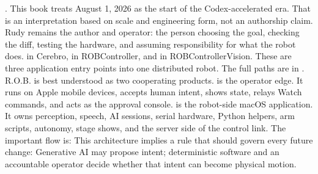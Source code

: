 {}.\markdownRendererParagraphSeparator
{}This book treats August 1, 2026 as the start of the Codex-accelerated era. That\markdownRendererSoftLineBreak
{}is an interpretation based on scale and engineering form, not an authorship\markdownRendererSoftLineBreak
{}claim. Rudy remains the author and operator: the person choosing the goal,\markdownRendererSoftLineBreak
{}checking the diff, testing the hardware, and assuming responsibility for what\markdownRendererSoftLineBreak
{}the robot does.\markdownRendererInterblockSeparator
{}\markdownRendererThematicBreak{}\markdownRendererInterblockSeparator
{}
\markdownRendererSectionEnd \markdownRendererSectionBegin
{}\markdownRendererInterblockSeparator
{}\markdownRendererBlockQuoteBegin
{}  in Cerebro,  in ROBController, and  in ROBControllerVision. These are three application entry points into one distributed robot. The full paths are in .\markdownRendererBlockQuoteEnd \markdownRendererInterblockSeparator
{}R.O.B. is best understood as two cooperating products.\markdownRendererParagraphSeparator
{} is the operator edge. It runs on Apple mobile devices, accepts\markdownRendererSoftLineBreak
{}human intent, shows state, relays Watch commands, and acts as the approval\markdownRendererSoftLineBreak
{}console.  is the robot-side macOS application. It owns perception,\markdownRendererSoftLineBreak
{}speech, AI sessions, serial hardware, Python helpers, arm scripts, autonomy,\markdownRendererSoftLineBreak
{}stage shows, and the server side of the control link.\markdownRendererParagraphSeparator
{}The important flow is:\markdownRendererInterblockSeparator
{}\markdownRendererInterblockSeparator
{}This architecture implies a rule that should govern every future change:\markdownRendererInterblockSeparator
{}\markdownRendererBlockQuoteBegin
Generative AI may propose intent; deterministic software and an accountable\markdownRendererSoftLineBreak
{}operator decide whether that intent can become physical motion.\markdownRendererBlockQuoteEnd \markdownRendererInterblockSeparator
